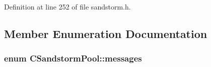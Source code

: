 Definition at line 252 of file sandstorm.\+h.



\subsection{Member Enumeration Documentation}
\hypertarget{class_c_sandstorm_pool_a539548228c53649bed42e158a86eded2}{}
\subsubsection[{messages}]{\setlength{\rightskip}{0pt plus 5cm}enum {\bf C\+Sandstorm\+Pool\+::messages}}\label{class_c_sandstorm_pool_a539548228c53649bed42e158a86eded2}
